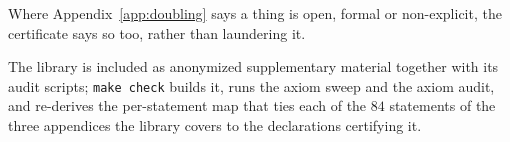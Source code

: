 Where Appendix~\ref{app:doubling} says a thing is open, formal or non-explicit, the certificate
says so too, rather than laundering it.

The library is included as anonymized supplementary material together with its audit scripts;
\texttt{make check} builds it, runs the axiom sweep and the axiom audit, and re-derives the
per-statement map that ties each of the $84$ statements of the three appendices the library
covers to the declarations certifying it.

